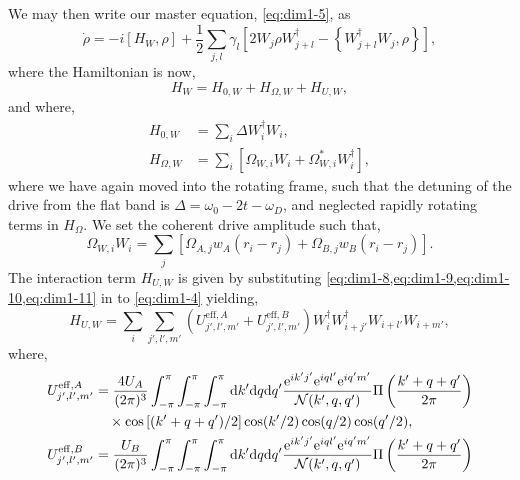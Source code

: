 We may then write our master equation, \cref{eq:dim1-5}, as
\begin{equation}
	\dot{\rho} = -i[H_{W}, \rho] + \frac{1}{2} \sum_{j,l} \gamma_{l} \left[ 2W_{j} \rho W_{j+l}^{\dagger} - \left\{W_{j+l}^{\dagger}W_{j}, \rho\right\}\right],
	\label{eq:dim1-12}
\end{equation}
where the Hamiltonian is now,
\begin{equation}
	H_{W} = H_{0,W} + H_{\Omega,W} + H_{U,W},
	\label{eq:dim1-13}
\end{equation}
and where,
\begin{align}
	H_{0,W} &= \sum_{i} \Delta W_{i}^{\dagger}W_{i}, \label{eq:dim1-14} \\
	H_{\Omega,W} &= \sum_{i} \left[ \Omega_{W,i}W_{i} + \Omega_{W,i}^{*} W_{i}^{\dagger} \right], \label{eq:dim1-15}
\end{align}
where we have again moved into the rotating frame, such that the detuning of the drive from the flat band is \(\Delta = \omega_{0} - 2t - \omega_{D}\), and neglected rapidly rotating terms in \(H_{\Omega}\). We set the coherent drive amplitude such that,
\begin{equation}
	\Omega_{W,i}W_{i} = \sum_{j} \left[ \Omega_{A,j}w_{A}(r_{i} - r_{j}) + \Omega_{B,j}w_{B}(r_{i} - r_{j}) \right].
	\label{eq:dim1-16}
\end{equation}
The interaction term \(H_{U,W}\) is given by substituting \cref{eq:dim1-8,eq:dim1-9,eq:dim1-10,eq:dim1-11} in to \cref{eq:dim1-4} yielding,
\begin{equation}
	H_{U,W} = \sum_{i} \sum_{j',l',m'} \left( U_{j',l',m'}^{\mathrm{eff},A} + U_{j',l',m'}^{\mathrm{eff},B} \right)W_{i}^{\dagger}W_{i+j'}^{\dagger}W_{i+l'}W_{i+m'},
	\label{eq:dim1-17}
\end{equation}
where,
\begin{align}
	U_{j',l',m'}^{\mathrm{eff},A} &= \frac{4U_{A}}{(2\pi)^{3}} \int^{\pi}_{-\pi} \int^{\pi}_{-\pi} \int^{\pi}_{-\pi} \mathrm{d}k' \mathrm{d}q \mathrm{d}q' \frac{\mathrm{e}^{ik'j'}\mathrm{e}^{iql'}\mathrm{e}^{iq'm'}}{\mathcal{N}(k',q,q')} \Pi\left( \frac{k'+q+q'}{2\pi} \right) \notag \\
	&\quad \times \cos\left[(k'+q+q')/2\right]\cos(k'/2)\cos(q/2)\cos(q'/2), \label{eq:dim1-18} \\
	U_{j',l',m'}^{\mathrm{eff},B} &= \frac{U_{B}}{(2\pi)^{3}} \int^{\pi}_{-\pi} \int^{\pi}_{-\pi} \int^{\pi}_{-\pi} \mathrm{d}k' \mathrm{d}q \mathrm{d}q' \frac{\mathrm{e}^{ik'j'}\mathrm{e}^{iql'}\mathrm{e}^{iq'm'}}{\mathcal{N}(k',q,q')} \Pi\left( \frac{k'+q+q'}{2\pi} \right) \label{eq:dim1-19}
\end{align}
